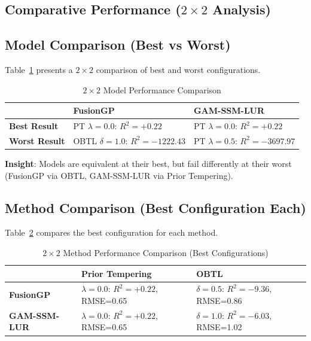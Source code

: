 \subsection{Comparative Performance (\(2 \times 2\) Analysis)}
\label{sec:comparative_2x2}

\subsection{Model Comparison (Best vs Worst)}
\label{subsec:model_comparison}

Table~\ref{tab:model_2x2} presents a \(2 \times 2\) comparison of best and worst configurations.

\begin{table}[htbp]
\centering
\caption{\(2 \times 2\) Model Performance Comparison}
\label{tab:model_2x2}
\begin{tabular}{lll}
\toprule
 & \textbf{FusionGP} & \textbf{GAM-SSM-LUR} \\
\midrule
\textbf{Best Result} & PT \(\lambda=0.0\): \(R^2=+0.22\) & PT \(\lambda=0.0\): \(R^2=+0.22\) \\
\textbf{Worst Result} & OBTL \(\delta=1.0\): \(R^2=-1222.43\) & PT \(\lambda=0.5\): \(R^2=-3697.97\) \\
\bottomrule
\end{tabular}
\end{table}

\textbf{Insight}: Models are equivalent at their best, but fail differently at their worst (FusionGP via OBTL, GAM-SSM-LUR via Prior Tempering).

\subsection{Method Comparison (Best Configuration Each)}
\label{subsec:method_comparison}

Table~\ref{tab:method_2x2} compares the best configuration for each method.

\begin{table}[htbp]
\centering
\caption{\(2 \times 2\) Method Performance Comparison (Best Configurations)}
\label{tab:method_2x2}
\begin{tabular}{lll}
\toprule
 & \textbf{Prior Tempering} & \textbf{OBTL} \\
\midrule
\textbf{FusionGP} & \(\lambda=0.0\): \(R^2=+0.22\), RMSE=0.65 & \(\delta=0.5\): \(R^2=-9.36\), RMSE=0.86 \\
\textbf{GAM-SSM-LUR} & \(\lambda=0.0\): \(R^2=+0.22\), RMSE=0.65 & \(\delta=1.0\): \(R^2=-6.03\), RMSE=1.02 \\
\bottomrule
\end{tabular}
\end{table}

